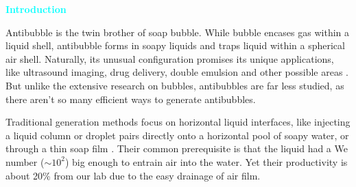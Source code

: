 \documentclass[%
 preprint,
 superscriptaddress,
 amsmath,amssymb,
 aps, prl,
]{revtex4-2}
\begin{document}
\textcolor{cyan}{\textbf{Introduction}}\par
    {\color{red}
    Antibubble is the twin brother of soap bubble. While bubble encases gas within a liquid shell, antibubble forms in soapy liquids and traps liquid within a spherical air shell. Naturally, its unusual configuration promises its unique applications, like ultrasound imaging, drug delivery, double emulsion and other possible areas \cite{Postema2018ultrasoundimaging,Postema2007drugdelivery,Silpe2013doubleemulsion}. But unlike the extensive research on bubbles, antibubbles are far less studied,  as there aren't so many efficient ways to generate antibubbles.\par
    Traditional generation methods focus on horizontal liquid interfaces, like injecting a liquid column\cite{Kim2008liquidcolumns} or droplet pairs \cite{Song2020droppairs} directly onto a horizontal pool of soapy water, or through a thin soap film \cite{Zou2017liquidfilm}. Their common prerequisite is that the liquid had a We number ($\sim 10^2$) big enough to entrain air into the water. Yet their productivity is about 20\% from our lab due to the easy drainage of air film.\par
}
\end{document}
